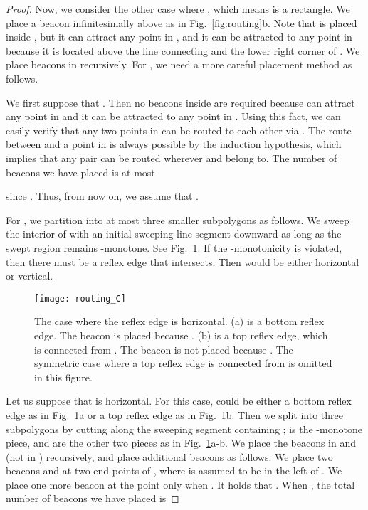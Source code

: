 \documentclass[11pt]{article}
\theoremstyle{definition}
\begin{document}
\begin{proof}
Now, we consider the other case where , which means  is a rectangle. We place a beacon  infinitesimally above  as in Fig.~\ref{fig:routing}b. Note that  is placed inside , but it can attract any point in , and it can be attracted to any point in  because it is located above the line connecting  and the lower right corner of . We place  beacons in  recursively. For , we need a more careful placement method as follows. 

We first suppose that . Then no beacons inside  are required because  can attract any point in  and it can be attracted to any point in . Using this fact, we can easily verify that any two points in  can be routed to each other via . The route between  and a point in  is always possible by the induction hypothesis, which implies that any pair  can be routed wherever  and  belong to. The number of beacons we have placed is at most

since . Thus, from now on, we assume that . 

For , we partition  into at most three smaller subpolygons as follows. We sweep the interior of  with an initial sweeping line segment  downward as long as the swept region remains -monotone. See Fig.~\ref{fig:routing_C}. If the -monotonicity is violated, then there must be a reflex edge  that  intersects. Then  would be either horizontal or vertical. 

\begin{figure}[tb]
\centering
\texttt{[image: routing\_C]}
\caption{The case where the reflex edge  is horizontal. (a)  is a bottom reflex edge. The beacon  is placed because . (b)  is a top reflex edge, which is connected from . The beacon  is not placed because . The symmetric case where a top reflex edge  is connected from  is omitted in this figure.}
\label{fig:routing_C}
\end{figure}

Let us suppose that  is horizontal. For this case,  could be either a bottom reflex edge as in Fig.~\ref{fig:routing_C}a or a top reflex edge as in Fig.~\ref{fig:routing_C}b. Then we split  into three subpolygons by cutting  along the sweeping segment  containing ;  is the -monotone piece,  and  are the other two pieces as in Fig.~\ref{fig:routing_C}a-b. We place the beacons in  and  (not in ) recursively, and place additional beacons as follows. We place two beacons  and  at two end points of , where  is assumed to be in the left of . We place one more beacon  at the point  only when . It holds that . When , the total number of beacons we have placed is


\end{proof}
\end{document}

